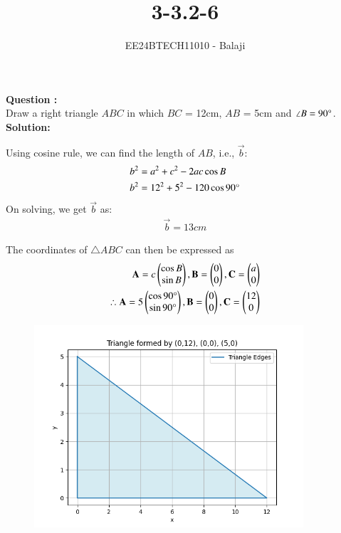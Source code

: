 \documentclass[journal]{IEEEtran}
\begin{document}

\vspace{3cm}

\title{3-3.2-6}
\author{EE24BTECH11010 - Balaji}
{\let\newpage\relax\maketitle}

\renewcommand{\thefigure}{\theenumi}
\renewcommand{\thetable}{\theenumi}
\setlength{\intextsep}{10pt} %

\renewcommand{\thetable}{\theenumi}

\textbf{Question :} \\
Draw a right triangle $ABC$ in which $BC$ = 12cm, $AB$ = 5cm and $\angle{B} = 90\degree$.\\
\textbf{Solution:}

\begin{table}[h!]
      \centering
      
      \caption{}
\end{table}
Using cosine rule, we can find the length of $AB$, i.e., $\vec{b}$:
\begin{align}
    b^2 &= a^2 + c^2 - 2ac\cos{B}\\
    b^2 &= 12^2 + 5^2 - 120\cos{90\degree}
\end{align}
On solving, we get $\vec{b}$ as:
\begin{align}
    \vec{b} = 13cm
\end{align}

The coordinates of $\triangle ABC$ can then be expressed as
\begin{align}
    \mathbf{A} = c\begin{pmatrix}\cos{B} \\ \sin{B}\end{pmatrix}, \mathbf{B} = \begin{pmatrix}0 \\ 0\end{pmatrix}, \mathbf{C} = \begin{pmatrix}a \\ 0\end{pmatrix}\\
    \therefore \mathbf{A} = 5\begin{pmatrix}\cos{90\degree} \\ \sin{90\degree}\end{pmatrix}, \mathbf{B} = \begin{pmatrix}0 \\ 0\end{pmatrix}, \mathbf{C} = \begin{pmatrix} 12\\ 0\end{pmatrix}
\end{align}
\begin{figure}
    \centering
    \includegraphics[width=10cm]{figs/fig.png}
    \caption{}
    \label{fig:enter-label}
\end{figure}
\end{document}
